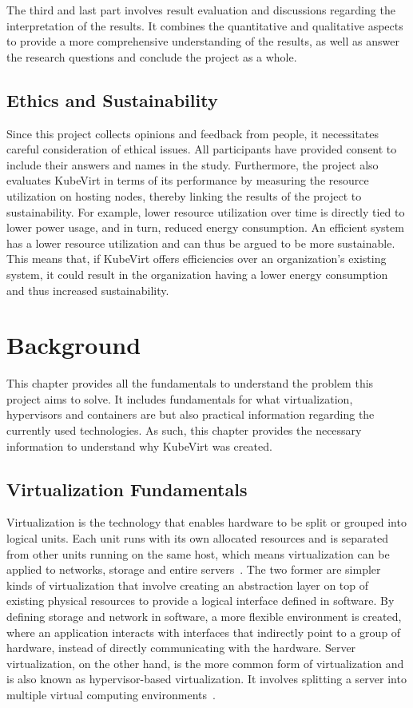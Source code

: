 \documentclass{kththesis}
\begin{document}
The third and last part involves result evaluation and discussions regarding the interpretation of the results. It combines the quantitative and qualitative aspects to provide a more comprehensive understanding of the results, as well as answer the research questions and conclude the project as a whole.

\section{Ethics and Sustainability}

Since this project collects opinions and feedback from people, it necessitates careful consideration of ethical issues. All participants have provided consent to include their answers and names in the study. Furthermore, the project also evaluates KubeVirt in terms of its performance by measuring the resource utilization on hosting nodes, thereby linking the results of the project to sustainability. For example, lower resource utilization over time is directly tied to lower power usage, and in turn, reduced energy consumption. An efficient system has a lower resource utilization and can thus be argued to be more sustainable. This means that, if KubeVirt offers efficiencies over an organization's existing system, it could result in the organization having a lower energy consumption and thus increased sustainability. 

\chapter{Background}

This chapter provides all the fundamentals to understand the problem this project aims to solve. It includes fundamentals for what virtualization, hypervisors and containers are but also practical information regarding the currently used technologies. As such, this chapter provides the necessary information to understand why KubeVirt was created.

\section{Virtualization Fundamentals}
\label{virtualization}
Virtualization is the technology that enables hardware to be split or grouped into logical units. Each unit runs with its own allocated resources and is separated from other units running on the same host, which means virtualization can be applied to networks, storage and entire servers\ \cite{virtualization-basics}. The two former are simpler kinds of virtualization that involve creating an abstraction layer on top of existing physical resources to provide a logical interface defined in software. By defining storage and network in software, a more flexible environment is created, where an application interacts with interfaces that indirectly point to a group of hardware, instead of directly communicating with the hardware. Server virtualization, on the other hand, is the more common form of virtualization and is also known as hypervisor-based virtualization. It involves splitting a server into multiple virtual computing environments\ \cite{virtualization-history}.
\end{document}
